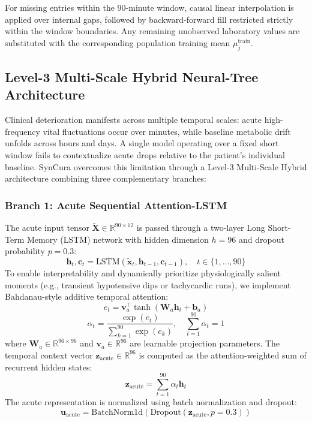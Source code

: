 \documentclass[conference]{IEEEtran}
\begin{document}
For missing entries within the 90-minute window, causal linear interpolation is applied over internal gaps, followed by backward-forward fill restricted strictly within the window boundaries. Any remaining unobserved laboratory values are substituted with the corresponding population training mean $\mu_j^{\text{train}}$.

\subsection{Level-3 Multi-Scale Hybrid Neural-Tree Architecture}
Clinical deterioration manifests across multiple temporal scales: acute high-frequency vital fluctuations occur over minutes, while baseline metabolic drift unfolds across hours and days. A single model operating over a fixed short window fails to contextualize acute drops relative to the patient's individual baseline. SynCura overcomes this limitation through a Level-3 Multi-Scale Hybrid architecture combining three complementary branches:

\subsubsection{Branch 1: Acute Sequential Attention-LSTM}
The acute input tensor $\tilde{\mathbf{X}} \in \mathbb{R}^{90 \times 12}$ is passed through a two-layer Long Short-Term Memory (LSTM) network with hidden dimension $h=96$ and dropout probability $p=0.3$:
\begin{equation}
    \mathbf{h}_t, \mathbf{c}_t = \mathrm{LSTM}(\tilde{\mathbf{x}}_t, \mathbf{h}_{t-1}, \mathbf{c}_{t-1}), \quad t \in \{1, \dots, 90\}
\end{equation}
To enable interpretability and dynamically prioritize physiologically salient moments (e.g., transient hypotensive dips or tachycardic runs), we implement Bahdanau-style additive temporal attention:
\begin{equation}
    e_t = \mathbf{v}_a^\top \tanh(\mathbf{W}_a \mathbf{h}_t + \mathbf{b}_a)
\end{equation}
\begin{equation}
    \alpha_t = \frac{\exp(e_t)}{\sum_{k=1}^{90} \exp(e_k)}, \quad \sum_{t=1}^{90} \alpha_t = 1
\end{equation}
where $\mathbf{W}_a \in \mathbb{R}^{96 \times 96}$ and $\mathbf{v}_a \in \mathbb{R}^{96}$ are learnable projection parameters. The temporal context vector $\mathbf{z}_{\text{acute}} \in \mathbb{R}^{96}$ is computed as the attention-weighted sum of recurrent hidden states:
\begin{equation}
    \mathbf{z}_{\text{acute}} = \sum_{t=1}^{90} \alpha_t \mathbf{h}_t
\end{equation}
The acute representation is normalized using batch normalization and dropout:
\begin{equation}
    \mathbf{u}_{\text{acute}} = \mathrm{BatchNorm1d}(\mathrm{Dropout}(\mathbf{z}_{\text{acute}}, p=0.3))
\end{equation}
\end{document}
